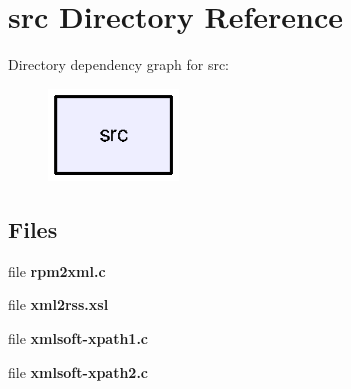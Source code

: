 \section{src Directory Reference}
\label{dir_68267d1309a1af8e8297ef4c3efbcdba}
Directory dependency graph for src\-:\nopagebreak
\begin{figure}[H]
\begin{center}
\leavevmode
\includegraphics[width=98pt]{dir_68267d1309a1af8e8297ef4c3efbcdba_dep}
\end{center}
\end{figure}
\subsection*{Files}
\begin{DoxyCompactItemize}
\item 
file {\bfseries rpm2xml.\-c}
\item 
file {\bfseries xml2rss.\-xsl}
\item 
file {\bfseries xmlsoft-\/xpath1.\-c}
\item 
file {\bfseries xmlsoft-\/xpath2.\-c}
\end{DoxyCompactItemize}
